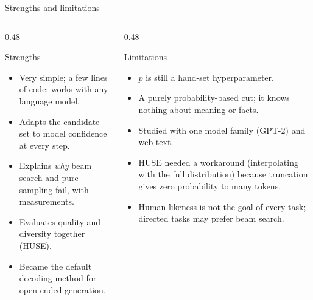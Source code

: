\documentclass[aspectratio=169,11pt]{beamer}
\begin{document}
\begin{frame}{Strengths and limitations}
  \begin{columns}[T]
    \begin{column}{0.48\textwidth}
      \begin{exampleblock}{Strengths}
        \small
        \begin{itemize}
          \item Very simple; a few lines of code; works with any language model.
          \item Adapts the candidate set to model confidence at every step.
          \item Explains \emph{why} beam search and pure sampling fail, with measurements.
          \item Evaluates quality and diversity together (HUSE).
          \item Became the default decoding method for open-ended generation.
        \end{itemize}
      \end{exampleblock}
    \end{column}
    \begin{column}{0.48\textwidth}
      \begin{alertblock}{Limitations}
        \small
        \begin{itemize}
          \item $p$ is still a hand-set hyperparameter.
          \item A purely probability-based cut; it knows nothing about meaning or facts.
          \item Studied with one model family (GPT-2) and web text.
          \item HUSE needed a workaround (interpolating with the full distribution) because truncation gives zero probability to many tokens.
          \item Human-likeness is not the goal of every task; directed tasks may prefer beam search.
        \end{itemize}
      \end{alertblock}
    \end{column}
  \end{columns}
\end{frame}
\end{document}

